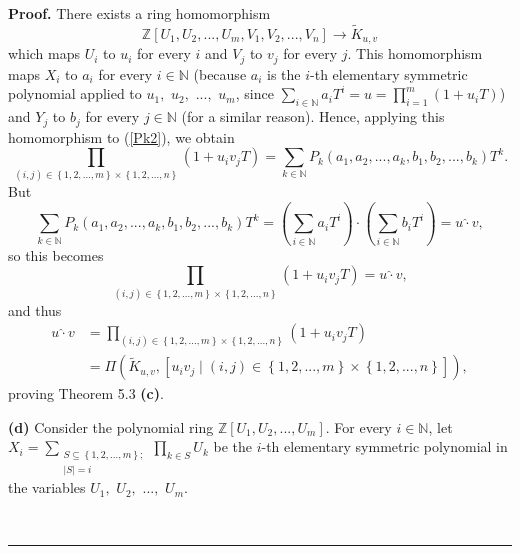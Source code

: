 \documentclass[numbers=enddot,12pt,final,onecolumn,notitlepage]{scrartcl}%
\newenvironment{proof}[1][Proof]{\noindent\textbf{#1.} }{\ \rule{0.5em}{0.5em}}
\begin{document}
\begin{proof}
There exists a ring homomorphism%
\[
\mathbb{Z}\left[  U_{1},U_{2},...,U_{m},V_{1},V_{2},...,V_{n}\right]
\rightarrow\widetilde{K}_{u,v}%
\]
which maps $U_{i}$ to $u_{i}$ for every $i$ and $V_{j}$ to $v_{j}$ for every
$j$. This homomorphism maps $X_{i}$ to $a_{i}$ for every $i\in\mathbb{N}$
(because $a_{i}$ is the $i$-th elementary symmetric polynomial applied to
$u_{1},$ $u_{2},$ $...,$ $u_{m}$, since $\sum\limits_{i\in\mathbb{N}}%
a_{i}T^{i}=u=\prod\limits_{i=1}^{m}\left(  1+u_{i}T\right)  $) and $Y_{j}$ to
$b_{j}$ for every $j\in\mathbb{N}$ (for a similar reason). Hence, applying
this homomorphism to (\ref{Pk2}), we obtain%
\[
\prod_{\left(  i,j\right)  \in\left\{  1,2,...,m\right\}  \times\left\{
1,2,...,n\right\}  }\left(  1+u_{i}v_{j}T\right)  =\sum_{k\in\mathbb{N}}%
P_{k}\left(  a_{1},a_{2},...,a_{k},b_{1},b_{2},...,b_{k}\right)  T^{k}.
\]
But%
\[
\sum_{k\in\mathbb{N}}P_{k}\left(  a_{1},a_{2},...,a_{k},b_{1},b_{2}%
,...,b_{k}\right)  T^{k}=\left(  \sum_{i\in\mathbb{N}}a_{i}T^{i}\right)
\widehat{\cdot}\left(  \sum_{i\in\mathbb{N}}b_{i}T^{i}\right)
=u\widehat{\cdot}v,
\]
so this becomes%
\[
\prod_{\left(  i,j\right)  \in\left\{  1,2,...,m\right\}  \times\left\{
1,2,...,n\right\}  }\left(  1+u_{i}v_{j}T\right)  =u\widehat{\cdot}v,
\]
and thus%
\begin{align*}
u\widehat{\cdot}v  &  =\prod_{\left(  i,j\right)  \in\left\{
1,2,...,m\right\}  \times\left\{  1,2,...,n\right\}  }\left(  1+u_{i}%
v_{j}T\right) \\
&  =\Pi\left(  \widetilde{K}_{u,v},\left[  u_{i}v_{j}\mid\left(  i,j\right)
\in\left\{  1,2,...,m\right\}  \times\left\{  1,2,...,n\right\}  \right]
\right)  ,
\end{align*}
proving Theorem 5.3 \textbf{(c)}.

\textbf{(d)} Consider the polynomial ring $\mathbb{Z}\left[  U_{1}%
,U_{2},...,U_{m}\right]  $. For every $i\in\mathbb{N}$, let $X_{i}%
=\sum\limits_{\substack{S\subseteq\left\{  1,2,...,m\right\}  ;\\\left\vert
S\right\vert =i}}\prod\limits_{k\in S}U_{k}$ be the $i$-th elementary
symmetric polynomial in the variables $U_{1},$ $U_{2},$ $...,$ $U_{m}$.


\end{proof}
\end{document}

